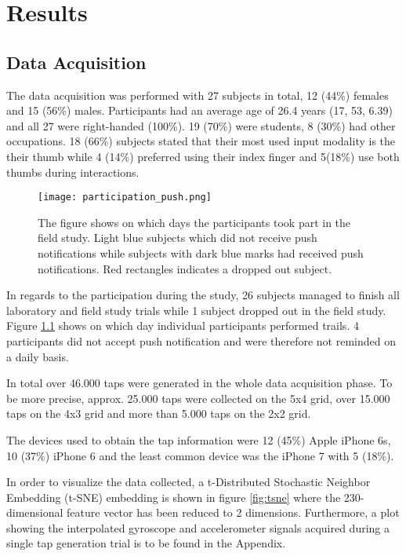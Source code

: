 \chapter{Results\label{cha:chapter6}}
\section{Data Acquisition}
The data acquisition was performed with 27 subjects in total, 12 (44\%) females and 15 (56\%) males. Participants had an average age of 26.4 years (17, 53, 6.39) and all 27 were right-handed (100\%). 19 (70\%) were students, 8 (30\%) had other occupations.
18 (66\%) subjects stated that their most used input modality is the their thumb while 4 (14\%) preferred using their index finger and 5(18\%) use both thumbs during interactions.\\

\begin{figure}[h!]
  \centering
  \texttt{[image: participation\_push.png]}
  \caption{The figure shows on which days the participants took part in the field study. Light blue subjects which did not receive push notifications while subjects with dark blue marks had received push notifications. Red rectangles indicates a dropped out subject.} \label{fig:participation}
\end{figure}

In regards to the participation during the study, 26 subjects managed to finish all laboratory and field study trials while 1 subject dropped out in the field study. Figure \ref{fig:participation} shows on which day individual participants performed trails. 4 participants did not accept push notification and were therefore not reminded on a daily basis.

In total over 46.000 taps were generated in the whole data acquisition phase. To be more precise, approx. 25.000 taps were collected on the 5x4 grid, over 15.000 taps on the 4x3 grid and more than 5.000 taps on the 2x2 grid.

The devices used to obtain the tap information were 12 (45\%) Apple iPhone 6s, 10 (37\%) iPhone 6 and the least common device was the iPhone 7 with 5 (18\%).

In order to visualize the data collected, a t-Distributed Stochastic Neighbor Embedding (t-SNE) embedding is shown in figure \ref{fig:tsne} where the 230-dimensional feature vector has been reduced to 2 dimensions. Furthermore, a plot showing the interpolated gyroscope and accelerometer signals acquired during a single tap generation trial is to be found in the Appendix.

